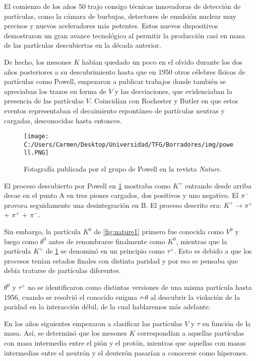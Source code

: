 El comienzo de los años 50 trajo consigo técnicas innovadoras de detección de partículas, como la cámara de burbujas, detectores de emulsión nuclear muy precisos y nuevos aceleradores más potentes. Estos nuevos dispositivos demostraron un gran avance tecnológico al permitir la producción casi en masa de las partículas descubiertas en la década anterior. 

De hecho, los mesones $K$ habían quedado un poco en el olvido durante los dos años posteriores a su descubrimiento hasta que en 1950 otros célebres físicos de partículas como Powell, empezaron a publicar trabajos donde también se apreciaban los trazos en forma de $V$ y las desviaciones, que evidenciaban la presencia de las partículas $V$. Coincidían con Rochester y Butler en que estos eventos representaban el decaimiento espontáneo de partículas neutras y cargadas, desconocidas hasta entonces. 

\begin{figure}[h!]
	\centering
	\texttt{[image: C:/Users/Carmen/Desktop/Universidad/TFG/Borradores/img/powell.PNG]}
	\caption[Fotografía de Powell mostrando una trayectoria ``kink'']
	{Fotografía publicada por el grupo de Powell en la revista \textit{Nature}. \cite{Griffiths2008}}
	\label{fig:powell}
\end{figure}

El proceso descubierto por Powell en \ref{fig:powell} mostraba como $K^+$ entrando desde arriba decae en el punto A en tres piones cargados, dos positivos y uno negativo. El $\pi^-$ provoca seguidamente una desintegración en B. El proceso descrito era: $K^+ \rightarrow \pi^+$ + $\pi^+$ +  $\pi^- $.

Sin embargo, la partícula $K^0$ de \ref{fig:nature1} primero fue conocida como $V^0$ y luego como $\theta^0$ antes de renombrarse finalmente como $K^0$, mientras que la partícula $K^+$ de \ref{fig:powell} se denominó en un principio como $\tau^+$. Esto es debido a que los procesos tenían estados finales con distinta paridad y por eso se pensaba que debía tratarse de partículas diferentes.

$\theta^0$ y $\tau^+$ no se identificaron como distintas versiones de una misma partícula hasta 1956, cuando se resolvió el conocido enigma $\tau$-$\theta$ al descubrir la violación de la paridad en la interacción débil, de la cual hablaremos más adelante. \cite{Griffiths2008}

En los años siguientes empezaron a clasificar las partículas $V$ y $\tau$ en función de la masa. Así, se determinó que los mesones $K$ correspondían a aquellas partículas con masa intermedia entre el pión y el protón, mientras que aquellas con masas intermedias entre el neutrón y el deuterón pasarían a conocerse como hiperones. 

